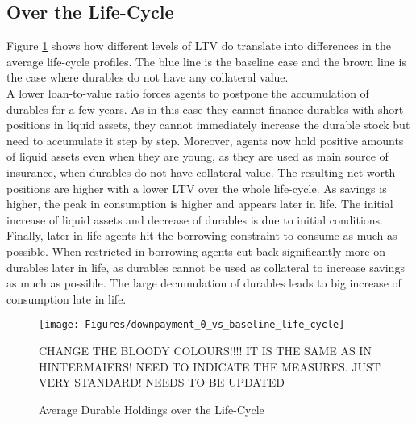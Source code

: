 \documentclass[a4paper,12pt,legno]{article}
\begin{document}
\subsection{Over the Life-Cycle}
Figure \ref{downpayment_vs_baseline_lc} shows how different levels of LTV do translate into differences in the average life-cycle profiles. The blue line is the baseline case and the brown line is the case where durables do not have any collateral value. \\ A lower loan-to-value ratio forces agents to  postpone the accumulation of durables for a few years. As in this case they cannot finance durables with short positions in liquid assets, they cannot immediately increase the durable stock but need to accumulate it step by step. Moreover, agents now hold positive amounts of liquid assets even when they are young, as they are used as main source of insurance, when durables do not have collateral value. The resulting net-worth positions are higher with a lower LTV over the whole life-cycle. As savings is higher, the peak in consumption is higher and appears later in life.
The initial increase of liquid assets and decrease of durables is due to initial conditions. Finally, later in life agents hit the borrowing constraint to consume as much as possible. When restricted in borrowing agents cut back significantly more on durables later in life, as durables cannot be used as collateral to increase savings as much as possible. The large decumulation of durables leads to big increase of consumption late in life. 


\begin{figure}[!htbp]
\caption{Average Durable Holdings over the Life-Cycle} 
\label{downpayment_vs_baseline_lc}	%
\centering
\texttt{[image: Figures/downpayment\_0\_vs\_baseline\_life\_cycle]}  %

\begin{minipage}{0.8\linewidth}
\footnotesize{CHANGE THE BLOODY COLOURS!!!! IT IS THE SAME AS IN HINTERMAIERS! NEED TO INDICATE THE MEASURES. JUST VERY STANDARD! NEEDS TO BE UPDATED}
\end{minipage}

\end{figure}
\end{document}
